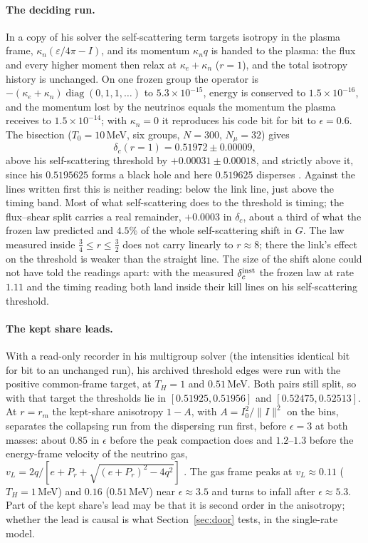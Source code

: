 \paragraph{The deciding run.} In a copy of his solver the self-scattering term targets isotropy in the plasma frame, $\kappa_n(\varepsilon/4\pi-I)$, and its momentum $\kappa_nq$ is handed to the plasma: the flux and every higher moment then relax at $\kappa_e+\kappa_n$ ($r=1$), and the total isotropy history is unchanged. On one frozen group the operator is $-(\kappa_e+\kappa_n)\operatorname{diag}(0,1,1,\dots)$ to $5.3\times10^{-15}$, energy is conserved to $1.5\times10^{-16}$, and the momentum lost by the neutrinos equals the momentum the plasma receives to $1.5\times10^{-14}$; with $\kappa_n=0$ it reproduces his code bit for bit to $\epsilon=0.6$. The bisection ($T_0=10$\,MeV, six groups, $N=300$, $N_\mu=32$) gives
\begin{equation}
\delta_c(r=1)=0.51972\pm0.00009,
\end{equation}
above his self-scattering threshold by $+0.00031\pm0.00018$, and strictly above it, since his $0.5195625$ forms a black hole and here $0.519625$ disperses . Against the lines written first this is neither reading: below the link line, just above the timing band. Most of what self-scattering does to the threshold is timing; the flux--shear split carries a real remainder, $+0.0003$ in $\delta_c$, about a third of what the frozen law predicted and $4.5\%$ of the whole self-scattering shift in $G$. The law measured inside $\tfrac34\le r\le\tfrac32$ does not carry linearly to $r\approx8$; there the link's effect on the threshold is weaker than the straight line. The size of the shift alone could not have told the readings apart: with the measured $\delta_c^{\rm inst}$ the frozen law at rate $1.11$ and the timing reading both land inside their kill lines on his self-scattering threshold.

\paragraph{The kept share leads.} With a read-only recorder in his multigroup solver (the intensities identical bit for bit to an unchanged run), his archived threshold edges were run with the positive common-frame target, at $T_H=1$ and $0.51$\,MeV. Both pairs still split, so with that target the thresholds lie in $[0.51925,0.51956]$ and $[0.52475,0.52513]$. At $r=r_m$ the kept-share anisotropy $1-A$, with $A=I_0^2/\lVert I\rVert^2$ on the bins, separates the collapsing run from the dispersing run first, before $\epsilon=3$ at both masses: about $0.85$ in $\epsilon$ before the peak compaction does and $1.2$--$1.3$ before the energy-frame velocity of the neutrino gas, $v_L=2q/[e+P_r+\sqrt{(e+P_r)^2-4q^2}]$ . The gas frame peaks at $v_L\approx0.11$ ($T_H=1$\,MeV) and $0.16$ ($0.51$\,MeV) near $\epsilon\approx3.5$ and turns to infall after $\epsilon\approx5.3$. Part of the kept share's lead may be that it is second order in the anisotropy; whether the lead is causal is what Section~\ref{sec:door} tests, in the single-rate model.

